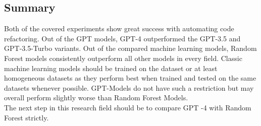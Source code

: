 \subsection{Summary}
Both of the covered experiments show great success with automating code refactoring. Out of the GPT models, GPT-4 outperformed the GPT-3.5 and GPT-3.5-Turbo variants. Out of the compared machine learning models, Random Forest models consistently outperform all other models in every field. Classic machine learning models should be trained on the dataset or at least homogeneous datasets as they perform best when trained and tested on the same datasets whenever possible. GPT-Models do not have such a restriction but may overall perform slightly worse than Random Forest Models.\\
The next step in this research field should be to compare GPT -4 with Random Forest strictly.